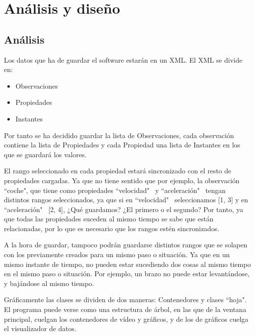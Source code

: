 \chapter{An\'{a}lisis y dise\~{n}o}


\section{An\'{a}lisis}
Los datos que ha de guardar el software estar\'an en un XML. El XML se divide en:
\begin{itemize}
	\item Observaciones
	\item Propiedades
	\item Instantes
\end{itemize}

Por tanto se ha decidido guardar la lista de Observaciones, cada observaci\'on contiene la lista de Propiedades 
y cada Propiedad una lista de Instantes en los que se guardar\'a los valores.

El rango seleccionado en cada propiedad estar\'a sincronizado con el resto de propiedades cargadas. 
Ya que no tiene sentido que por ejemplo, la observaci\'on ``coche", 
que tiene como propiedades ``velocidad" \ y ``aceleraci\'on" \ tengan distintos rangos 
seleccionados, ya que si en ``velocidad" \ seleccionamos [1, 3] y en ``aceleraci\'on" \ [2, 4], 
¿Qu\'e guardamos? ¿El primero o el segundo? Por tanto, ya que todas las propiedades suceden al
mismo tiempo se sabe que est\'an relacionadas, por lo que es necesario que los rangos est\'en
sincronizados.

A la hora de guardar, tampoco podr\'an guardarse distintos rangos que se solapen con los
previamente creados para un mismo paso o situaci\'on. Ya que en un mismo instante de 
tiempo, no pueden estar sucediendo dos cosas al mismo tiempo en el mismo paso o situaci\'on.
Por ejemplo, un brazo no puede estar levant\'andose, y baj\'andose al mismo tiempo.

Gr\'aficamente las clases se dividen de dos maneras: Contenedores y clases ``hoja".
El programa puede verse como una estructura de \'arbol, en las que de la ventana principal,
cuelgan los contenedores de v\'ideo y gr\'aficos, y de los de gr\'aficos cuelga el 
visualizador de datos.

